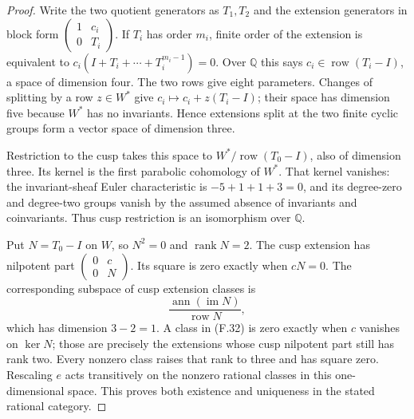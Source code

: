 \begin{proof}
Write the two quotient generators as $T_1,T_2$ and the
extension generators in block form
$\left(\begin{smallmatrix}1&c_i\\0&T_i\end{smallmatrix}\right)$.
If $T_i$ has order $m_i$, finite order of the extension is
equivalent to $c_i(I+T_i+\cdots+T_i^{m_i-1})=0$.
Over $\mathbb Q$ this says $c_i\in\operatorname{row}(T_i-I)$,
a space of dimension four.  The two rows give eight
parameters.  Changes of splitting by a row $z\in W^*$
give $c_i\mapsto c_i+z(T_i-I)$; their space has dimension
five because $W^*$ has no invariants.  Hence extensions
split at the two finite cyclic groups form a vector space
of dimension three.

Restriction to the cusp takes this space to
$W^*/\operatorname{row}(T_0-I)$, also of dimension three.
Its kernel is the first parabolic cohomology of $W^*$.
That kernel vanishes: the invariant-sheaf Euler characteristic
is $-5+1+1+3=0$, and its degree-zero and degree-two groups
vanish by the assumed absence of invariants and coinvariants.
Thus cusp restriction is an isomorphism over $\mathbb Q$.

Put $N=T_0-I$ on $W$, so $N^2=0$ and $\operatorname{rank}N=2$.
The cusp extension has nilpotent part
$\left(\begin{smallmatrix}0&c\\0&N\end{smallmatrix}\right)$.
Its square is zero exactly when $cN=0$.
The corresponding subspace of cusp extension classes is
\[
 \frac{\operatorname{ann}(\operatorname{im}N)}
      {\operatorname{row}N},
 \tag{F.32}
\]
which has dimension $3-2=1$.
A class in (F.32) is zero exactly when $c$ vanishes on
$\ker N$; those are precisely the extensions whose cusp
nilpotent part still has rank two.
Every nonzero class raises that rank to three and has square
zero.  Rescaling $e$ acts transitively on the nonzero rational
classes in this one-dimensional space.  This proves both
existence and uniqueness in the stated rational category.
\end{proof}

